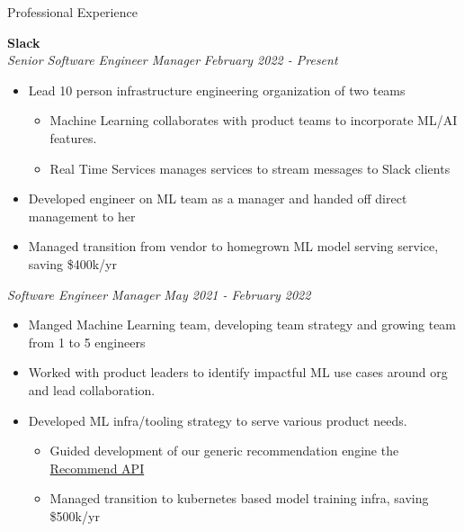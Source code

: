 \documentclass{resume} %
\begin{document}
\begin{rSection}{Professional Experience}

\vspace{0.2em}

{\bf Slack} \\
{\em Senior Software Engineer Manager} \hfill {\em February 2022 - Present}  \vspace{0.1em} 
\begin{itemize} \itemsep -0.2em
	\item Lead 10 person infrastructure engineering organization of two teams
	\vspace{-0.2em}
        \begin{itemize} \itemsep -0.2em
            \item Machine Learning collaborates with product teams to incorporate ML/AI features.
            \item Real Time Services manages services to stream messages to Slack clients
        \end{itemize}
    \item Developed engineer on ML team as a manager and handed off direct management to her
    \item Managed transition from vendor to homegrown ML model serving service, saving \$400k/yr
\end{itemize}
{\em Software Engineer Manager} \hfill {\em May 2021 - February 2022} \vspace{0.1em} 
\begin{itemize} \itemsep -0.2em
	\item Manged Machine Learning team, developing team strategy and growing team from 1 to 5 engineers
	\item Worked with product leaders to identify impactful ML use cases around org and lead collaboration.
	\item Developed ML infra/tooling strategy to serve various product needs.
	\vspace{-0.2em}
        \begin{itemize} \itemsep -0.2em
            \item Guided development of our generic recommendation engine the \href{https://slack.engineering/recommend-api/}{Recommend API} 
            \item Managed transition to kubernetes based model training infra, saving \$500k/yr
        \end{itemize}
\end{itemize}

\end{rSection}
\end{document}
